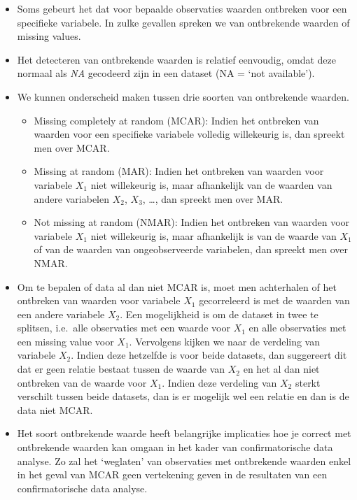 \documentclass[]{tufte-book}
\providecommand{\tightlist}{%
  \setlength{\itemsep}{0pt}\setlength{\parskip}{0pt}}
\begin{document}
\begin{itemize}
\tightlist
\item
  Soms gebeurt het dat voor bepaalde observaties waarden ontbreken voor een specifieke variabele. In zulke gevallen spreken we van ontbrekende waarden of missing values.
\item
  Het detecteren van ontbrekende waarden is relatief eenvoudig, omdat deze normaal als \emph{NA} gecodeerd zijn in een dataset (NA = `not available').
\item
  We kunnen onderscheid maken tussen drie soorten van ontbrekende waarden.

  \begin{itemize}
  \tightlist
  \item
    Missing completely at random (MCAR): Indien het ontbreken van waarden voor een specifieke variabele volledig willekeurig is, dan spreekt men over MCAR.
  \item
    Missing at random (MAR): Indien het ontbreken van waarden voor variabele \(X_1\) niet willekeurig is, maar afhankelijk van de waarden van andere variabelen \(X_2\), \(X_3\), \ldots, dan spreekt men over MAR.
  \item
    Not missing at random (NMAR): Indien het ontbreken van waarden voor variabele \(X_1\) niet willekeurig is, maar afhankelijk is van de waarde van \(X_1\) of van de waarden van ongeobserveerde variabelen, dan spreekt men over NMAR.
  \end{itemize}
\item
  Om te bepalen of data al dan niet MCAR is, moet men achterhalen of het ontbreken van waarden voor variabele \(X_1\) gecorreleerd is met de waarden van een andere variabele \(X_2\). Een mogelijkheid is om de dataset in twee te splitsen, i.e.~alle observaties met een waarde voor \(X_1\) en alle observaties met een missing value voor \(X_1\). Vervolgens kijken we naar de verdeling van variabele \(X_2\). Indien deze hetzelfde is voor beide datasets, dan suggereert dit dat er geen relatie bestaat tussen de waarde van \(X_2\) en het al dan niet ontbreken van de waarde voor \(X_1\). Indien deze verdeling van \(X_2\) sterkt verschilt tussen beide datasets, dan is er mogelijk wel een relatie en dan is de data niet MCAR.\\
\item
  Het soort ontbrekende waarde heeft belangrijke implicaties hoe je correct met ontbrekende waarden kan omgaan in het kader van confirmatorische data analyse. Zo zal het `weglaten' van observaties met ontbrekende waarden enkel in het geval van MCAR geen vertekening geven in de resultaten van een confirmatorische data analyse.

\end{itemize}
\end{document}
